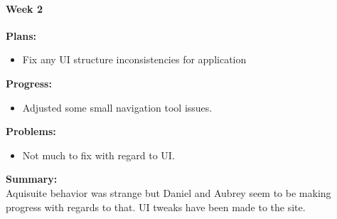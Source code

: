 \paragraph{Week 2}
\begin{adjustwidth}{2.5em}{0pt}
    \vspace{-0.5cm}\textbf{Plans:}
    \vspace{-0.5cm}
    \begin{itemize}
        \item Fix any UI structure inconsistencies for application
    \end{itemize} 
    \vspace{-0.3cm}\textbf{Progress:}
    \vspace{-0.5cm}
    \begin{itemize}
        \item Adjusted some small navigation tool issues.
    \end{itemize} 
    \vspace{-0.3cm}\textbf{Problems:}
    \vspace{-0.5cm}
    \begin{itemize}
        \item Not much to fix with regard to UI.
    \end{itemize}  
    \vspace{-0.3cm}\noindent\textbf{Summary:}\\
    \noindent Aquisuite behavior was strange but Daniel and Aubrey seem to be making progress with regards to that. UI tweaks have been made to the site.
	\end{adjustwidth} 
